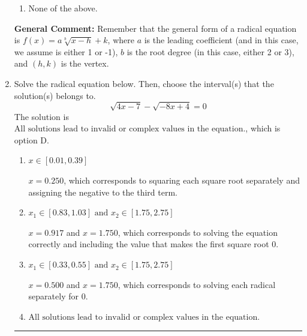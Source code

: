 \documentclass{extbook}[14pt]
\newcommand{\litem}[1]{\item #1

\rule{\textwidth}{0.4pt}}
\begin{document}
\begin{enumerate}
{\begin{enumerate}[label=\Alph*.]
\item None of the above.\end{enumerate}
\textbf{General Comment:} Remember that the general form of a radical equation is $ f(x) = a \sqrt[b]{x - h} + k $, where $a$ is the leading coefficient (and in this case, we assume is either 1 or -1), $b$ is the root degree (in this case, either 2 or 3), and $(h, k)$ is the vertex.
}
\litem{
Solve the radical equation below. Then, choose the interval(s) that the solution(s) belongs to.
\[ \sqrt{4 x - 7} - \sqrt{-8 x + 4} = 0 \]
The solution is \( \text{All solutions lead to invalid or complex values in the equation.} \), which is option D.\begin{enumerate}[label=\Alph*.]
\item \( x \in [0.01,0.39] \)

$x = 0.250$, which corresponds to squaring each square root separately and assigning the negative to the third term.
\item \( x_1 \in [0.83, 1.03] \text{ and } x_2 \in [1.75,2.75] \)

$x = 0.917$ and $x = 1.750$, which corresponds to solving the equation correctly and including the value that makes the first square root 0.
\item \( x_1 \in [0.33, 0.55] \text{ and } x_2 \in [1.75,2.75] \)

$x = 0.500$ and $x = 1.750$, which corresponds to solving each radical separately for 0.
\item \( \text{All solutions lead to invalid or complex values in the equation.} \)


\end{enumerate}}
\end{enumerate}
\end{document}
